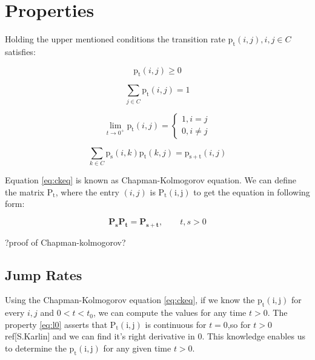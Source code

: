 \documentclass[thesis=M,english]{FITthesis}[2012/10/20]
\newcommand{\matr}[1]{\mathbf{#1}}
\begin{document}
\section{Properties} 

Holding the upper mentioned conditions the transition rate $\mathrm{p_t}(i,j), i,j \in C$ satisfies:%


\begin{equation}
\mathrm{p_t}(i,j) \geq 0
\end{equation}

\begin{equation}
\sum_{j \in C} \mathrm{p_t}(i,j) = 1
\end{equation}

\begin{equation}\label{eq:l0}  
\lim_{t \to 0^+} \mathrm{p_t}(i,j)= 
\begin{cases}
1, i = j\\
0, i \neq j
\end{cases}
\end{equation}

\begin{equation}\label{eq:ckeq}
\sum_{k \in C}\mathrm{p_s}(i,k)\mathrm{p_t}(k,j) = \mathrm{p_{s+t}}(i,j)     
\end{equation}

Equation \eqref{eq:ckeq} is known as Chapman-Kolmogorov equation. 
We can define the matrix $\mathrm{P_t}$, where the entry $(i,j)$ is $\mathrm{P_t(i,j)}$ to get the equation in following form:

\begin{equation}
\matr{P_s} \matr{P_t} = \matr{P_{s+t}},   \qquad t,s > 0  
\end{equation}

?proof of Chapman-kolmogorov?


\subsection{ Jump Rates }

Using the Chapman-Kolmogorov equation \eqref{eq:ckeq}, if we know the $\mathrm{p_t(i,j)}$ for every $i,j$ and $0 < t < t_0$, we can compute the values for any time $t > 0$. The property \eqref{eq:l0} asserts that $\mathrm{P_t(i,j)}$ is continuous for $t=0$,so for $t>0$ ref[S.Karlin] and we can find it's right derivative in 0. This knowledge enables us to determine the $\mathrm{p_t(i,j)}$ for any given time $t>0$.   
\end{document}
